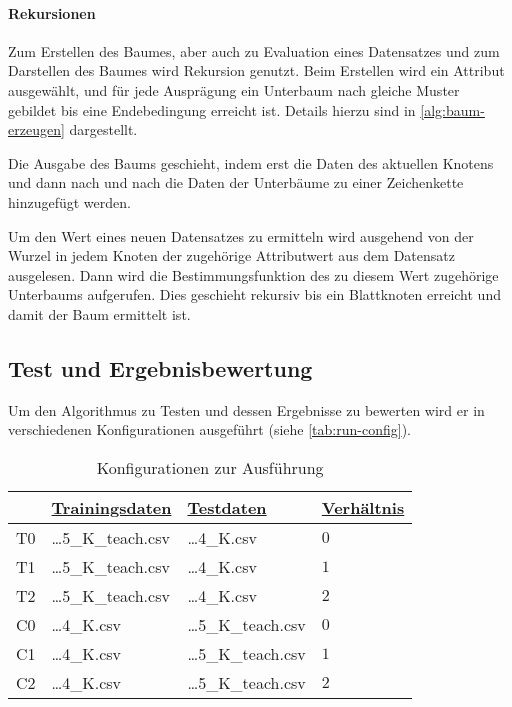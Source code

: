 \paragraph{Rekursionen}
Zum Erstellen des Baumes, aber auch zu Evaluation eines Datensatzes und zum Darstellen des Baumes wird Rekursion genutzt.
Beim Erstellen wird ein Attribut ausgewählt, und für jede Ausprägung ein Unterbaum nach gleiche Muster gebildet bis eine Endebedingung erreicht ist.
Details hierzu sind in \autoref{alg:baum-erzeugen} dargestellt.

Die Ausgabe des Baums geschieht,
indem erst die Daten des aktuellen Knotens und
dann nach und nach die Daten der Unterbäume zu einer Zeichenkette hinzugefügt werden.

Um den Wert eines neuen Datensatzes zu ermitteln wird ausgehend von der Wurzel in jedem Knoten der zugehörige Attributwert aus dem Datensatz ausgelesen.
Dann wird die Bestimmungsfunktion des zu diesem Wert zugehörige Unterbaums aufgerufen.
Dies geschieht rekursiv bis ein Blattknoten erreicht und damit der Baum ermittelt ist.

\subsection{Test und Ergebnisbewertung}
Um den Algorithmus zu Testen und dessen Ergebnisse zu bewerten wird er in verschiedenen Konfigurationen ausgeführt (siehe \autoref{tab:run-config}).


\useunder{\uline}{\ul}{}
\begin{table}[h]
    \begin{center}
        \begin{tabular}{|l|l|l|l|}
        \hline
                               & {\ul \textbf{Trainingsdaten}} & {\ul \textbf{Testdaten}}      & {\ul \textbf{Verhältnis}} \\
            \hline
            T0                  & \dots 5\_K\_teach.csv & \dots 4\_K.csv        & $0$ \\
            \hline
            T1                  & \dots 5\_K\_teach.csv & \dots 4\_K.csv        & $1$ \\
            \hline
            T2                  & \dots 5\_K\_teach.csv & \dots 4\_K.csv        & $2$ \\
            \hline
            \hline
            C0                  & \dots 4\_K.csv        & \dots 5\_K\_teach.csv & $0$ \\
            \hline
            C1                  & \dots 4\_K.csv        & \dots 5\_K\_teach.csv & $1$ \\
            \hline
            C2                  & \dots 4\_K.csv        & \dots 5\_K\_teach.csv & $2$ \\
            \hline
        \end{tabular}
        \caption{Konfigurationen zur Ausführung}
        \label{tab:run-config}
    \end{center}
\end{table}

